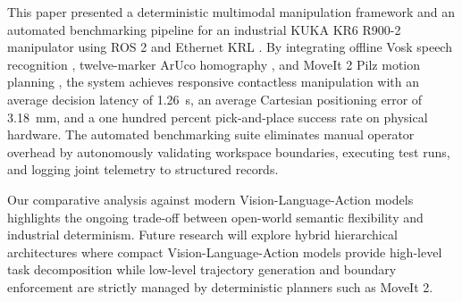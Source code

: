 \documentclass{svproc}
\begin{document}
This paper presented a deterministic multimodal manipulation framework and an automated benchmarking pipeline for an industrial KUKA KR6 R900-2 manipulator using ROS 2 \cite{ros2_2022} and Ethernet KRL \cite{kuka_eki2019}. By integrating offline Vosk speech recognition \cite{vosk2020}, twelve-marker ArUco homography \cite{aruco2014}, and MoveIt 2 \cite{moveit2014} Pilz motion planning \cite{pilz_motion2021}, the system achieves responsive contactless manipulation with an average decision latency of \SI{1.26}{\second}, an average Cartesian positioning error of \SI{3.18}{\milli\meter}, and a one hundred percent pick-and-place success rate on physical hardware. The automated benchmarking suite eliminates manual operator overhead by autonomously validating workspace boundaries, executing test runs, and logging joint telemetry to structured records.

Our comparative analysis against modern Vision-Language-Action models \cite{rt2_2023,openvla2024,octo2024} highlights the ongoing trade-off between open-world semantic flexibility and industrial determinism. Future research will explore hybrid hierarchical architectures where compact Vision-Language-Action models provide high-level task decomposition while low-level trajectory generation and boundary enforcement are strictly managed by deterministic planners such as MoveIt 2.
\end{document}

